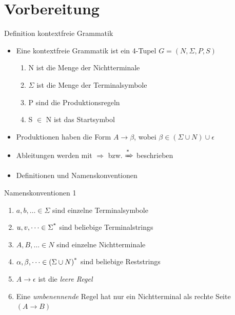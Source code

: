 \documentclass[
10pt,
pantone315, 	%
]{beamer}
\begin{document}
\section{Vorbereitung}
\begin{frame}[t]{Definition kontextfreie Grammatik}
	\begin{itemize}[<+->]
		\item
		Eine kontextfreie Grammatik ist ein 4-Tupel $G = (N, \Sigma , P, S)$
		\begin{enumerate}
			\item
			N ist die Menge der Nichtterminale
			\item
			$\Sigma$ ist die Menge der Terminalsymbole
			\item
			P sind die Produktionsregeln
			\item
			S $\in$ N ist das Startsymbol
		\end{enumerate}
		\item
		Produktionen haben die Form $A \rightarrow \beta$, wobei $\beta \in (\Sigma \cup N) \cup \epsilon$
		\item
		Ableitungen werden mit $\Rightarrow$ bzw. $\xRightarrow{\text{*}}$ beschrieben
		\item
		Definitionen und Namenskonventionen
	\end{itemize}
\end{frame}

\begin{frame}[t]{Namenskonventionen 1}
	\begin{enumerate}
		\item
		$a,b,\dots\in\Sigma$ sind einzelne Terminalsymbole
		\item 
		$u,v, \dots\in\Sigma\textsuperscript{*}$ sind beliebige Terminalstrings
		\item
		$A,B,\dots\in N$ sind einzelne Nichtterminale
		\item
		$\alpha,\beta,\dots\in (\Sigma \cup N)\textsuperscript{*}$ sind beliebige Reststrings
		\item
		$A \rightarrow \epsilon $ ist die \textit{leere Regel}
		\item
		Eine \textit{umbenennende} Regel hat nur ein Nichtterminal als rechte Seite $\left( A \rightarrow B \right)$

	\end{enumerate}
\end{frame}
\end{document}
